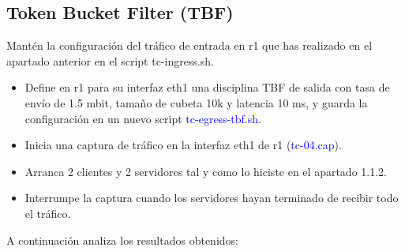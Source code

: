 \documentclass[12pt, a4paper]{report}
\begin{document}
\subsection{Token Bucket Filter (TBF)}
Mantén la configuración del tráfico de entrada en r1 que has realizado en el apartado anterior en
el script tc-ingress.sh.
\begin{itemize}
	\item Define en r1 para su interfaz eth1 una disciplina TBF de salida con tasa de envío de 1.5 mbit,
	tamaño de cubeta 10k y latencia 10 ms, y guarda la configuración en un nuevo script
	\textcolor{blue}{tc-egress-tbf.sh}.
	\item Inicia una captura de tráfico en la interfaz eth1 de r1 (\textcolor{blue}{tc-04.cap}).
	\item Arranca 2 clientes y 2 servidores tal y como lo hiciste en el apartado 1.1.2.
	\item Interrumpe la captura cuando los servidores hayan terminado de recibir todo el tráfico.
\end{itemize}
A continuación analiza los resultados obtenidos:
\end{document}
